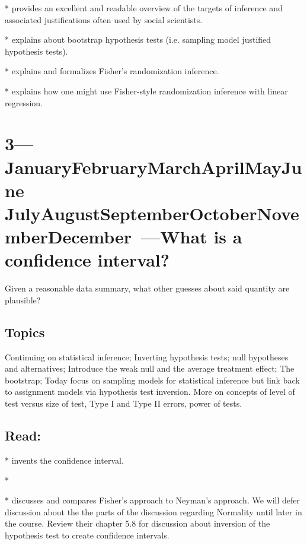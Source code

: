 \documentclass[10pt]{article}
\def\themonth{\ifcase\month\or
  January\or February\or March\or April\or May\or June\or
  July\or August\or September\or October\or November\or December\fi}
\begin{document}
*\citealp[Chap 4]{berk04} provides an excellent and readable overview
of the targets of inference and associated justifications often used
by social scientists.

*\citealp[Chap 21.4]{fox2008applied} explains about bootstrap hypothesis tests
(i.e. sampling model justified hypothesis tests).

*\citealp[Chap 2--2.4]{rosenbaum:2002} explains and formalizes Fisher's randomization inference.

*\citealp{rosenbaum:2002a} explains how one might use Fisher-style
randomization inference with linear regression.

\AdvanceDate[7]
\section{3---\themonth~\the\day---What is a confidence interval? }
Given a reasonable data summary, what other guesses about said
quantity are plausible?

\subsection{Topics} Continuing on statistical inference; Inverting
hypothesis tests; null hypotheses and alternatives; Introduce the weak
null and the average treatment effect; The bootstrap; Today focus on
sampling models for statistical inference but link back to assignment
models via hypothesis test inversion. More on concepts of
level of test versus size of test, Type I and Type II errors, power of tests.

\subsection{Read:}
\citealp[Chap 14]{kaplan2009ism}

\citealp[Chap 7]{gonick1993cgs}


*\citealp{neyman1937outline} invents the confidence interval.

*\citealp[Chap 21]{fox2008applied}

*\citealp[Chap 6]{imbens2009causal} discusses and compares Fisher's
approach to Neyman's approach. We will defer discussion about the the parts of the
discussion regarding Normality until later in the course. Review their
chapter 5.8 for discussion about inversion of the hypothesis test to
create confidence intervals.
\end{document}
